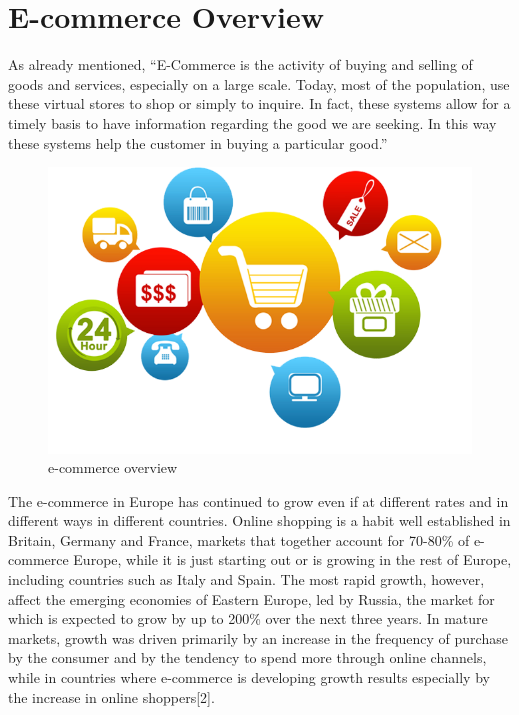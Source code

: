 \section{E-commerce Overview}
\label{sec:e_commerce_overview}
As already mentioned, “E-Commerce is the activity of buying and selling of goods and services, especially on a large scale. Today, most of the population, use these virtual stores to shop or simply to inquire. In fact, these systems allow for a timely basis to have information regarding the good we are seeking. In this way these systems help the customer in buying a particular good.”
\newline
\begin{figure}[htb]
 \centering
 \includegraphics[width=0.8\linewidth]{images/chapter1/e-commerce.png}\hfill
 \caption[e-commerce overview]{e-commerce overview}
 \label{fig:e_commerce_overview}
\end{figure}
The e-commerce in Europe has continued to grow even if at different rates and in different ways in different countries. Online shopping is a habit well established in Britain, Germany and France, markets that together account for 70-80\% of e-commerce Europe, while it is just starting out or is growing in the rest of Europe, including countries such as Italy and Spain. The most rapid growth, however, affect the emerging economies of Eastern Europe, led by Russia, the market for which is expected to grow by up to 200\% over the next three years.
\newline
In mature markets, growth was driven primarily by an increase in the frequency of purchase by the consumer and by the tendency to spend more through online channels, while in countries where e-commerce is developing growth results especially by the increase in online shoppers[2].
